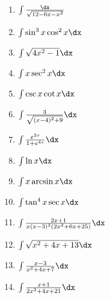 \documentclass{hw}
\begin{document}
\begin{multicols}{2}
\begin{enumerate}
\item {\Large $\int{\dx\over\sqrt{12-6x-x^2}}$}
\vspace{1cm}

\item {\Large $\int\sin^{3}{x}\cos^{2}{x}\dx$}
\vspace{1cm}

\item {\Large $\int\sqrt{4x^{2}-1}\dx$}
\vspace{1cm}

\item {\Large $\int x\sec^{2}{x}\dx$}
\vspace{1cm}

\item {\Large $\int \csc{x}\cot{x}\dx$}
\vspace{1cm}

\item {\Large $\int {3\over\sqrt{(x-4)^{2}+9}}\dx$}
\vspace{1cm}

\item {\Large $\int {e^{2x}\over 1+e^{4x}}\dx$}
\vspace{1cm}

\item {\Large $\int \ln{x}\dx$}
\vspace{1cm}

\item {\Large $\int x\arcsin{x}\dx$}
\vspace{1cm}

\item {\Large $\int\tan^{4}{x}\sec{x} \dx$}
\vspace{1cm}

\item {\Large $\int{2x+1\over x(x-3)^{3}(2x^{2}+6x+25)}\dx$}
\vspace{1cm}

\item {\Large $\int\sqrt{x^{2}+4x+13}\dx$}
\vspace{1cm}

\item {\Large $\int {x-3\over x^{2}+4x+7}\dx$}
\vspace{1cm}

\item {\Large $\int {x+1\over 2x^{2}+4x+21}\dx$}
\vspace{1cm}


\end{enumerate}
\end{multicols}
\end{document}
